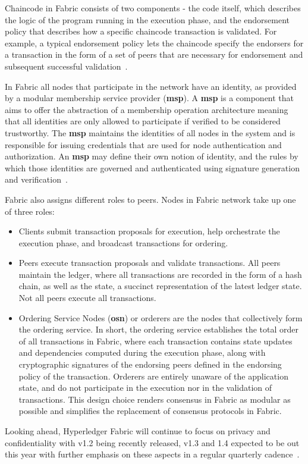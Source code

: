 Chaincode in Fabric consists of two components - the code itself, which
describes the logic of the program running in the execution phase, and the
endorsement policy that describes how a specific chaincode transaction is
validated. For example, a typical endorsement policy lets the chaincode specify
the endorsers for a transaction in the form of a set of peers that are
necessary for endorsement and subsequent successful
validation~\cite{Androulaki2018}.

In Fabric all nodes that participate in the network have an identity, as
provided by a modular membership service provider (\textbf{msp}).  A
\textbf{msp} is a component that aims to offer the abstraction of a membership
operation architecture meaning that all identities are only allowed to
participate if verified to be considered trustworthy.  The \textbf{msp}
maintains the identities of all nodes in the system and is responsible for
issuing credentials that are used for node authentication and authorization. An
\textbf{msp} may define their own notion of identity, and the rules by which
those identities are governed and authenticated using signature generation and
verification~\cite{HyperledgerFabricDocs2017}.

Fabric also assigns different roles to peers. Nodes in Fabric network take up
one of three roles:

\begin{itemize}
  \item Clients submit transaction proposals for execution, help orchestrate
    the execution phase, and broadcast transactions for ordering.

  \item Peers execute transaction proposals and validate transactions.  All
    peers maintain the ledger, where all transactions  are recorded in the form
    of a hash chain, as well as the state, a succinct representation of the
    latest ledger state. Not all peers execute all transactions.

  \item Ordering Service Nodes (\textbf{osn}) or orderers are the nodes that
    collectively form the ordering service. In short, the ordering service
    establishes the total order of all transactions in Fabric, where each
    transaction contains state updates and dependencies computed during the
    execution phase, along with cryptographic signatures of the endorsing peers
    defined in the endorsing policy of the transaction. Orderers are entirely
    unaware of the application state, and do not participate in the execution
    nor in the validation of transactions. This design choice renders consensus
    in Fabric as modular as possible and simplifies the replacement of
    consensus protocols in Fabric. 
\end{itemize}

Looking ahead, Hyperledger Fabric will continue to focus on privacy and
confidentiality with v1.2 being recently released, v1.3 and 1.4 expected to be
out this year with further emphasis on these aspects in a regular quarterly
cadence~\cite{hyperledgerRoadmap2018}.
